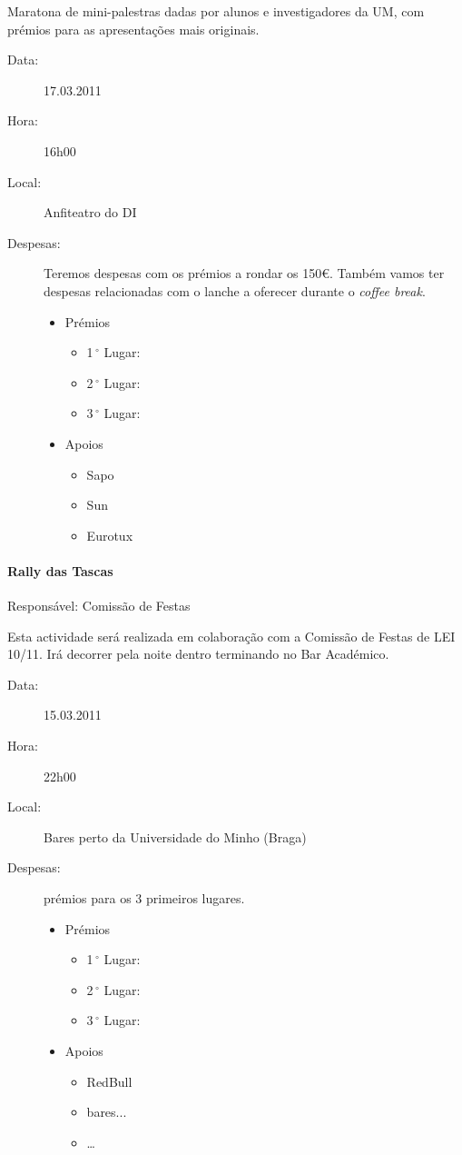 Maratona de mini-palestras dadas por alunos e investigadores da UM, com prémios para as apresentações mais originais.

\begin{description}
	\item[Data:] 17.03.2011
	\item[Hora:] 16h00
	\item[Local:] Anfiteatro do DI
	\item[Despesas:] Teremos despesas com os prémios a rondar os 150\euro. Também vamos ter despesas relacionadas com o lanche a oferecer durante o \emph{coffee break}.
		\begin{itemize}
		\item Prémios
		\begin{itemize}
			\item 1$\,^{\circ}$ Lugar:
			\item 2$\,^{\circ}$ Lugar:
			\item 3$\,^{\circ}$ Lugar:
		\end{itemize}
		\item Apoios
		\begin{itemize}
			\item Sapo
			\item Sun
			\item Eurotux
		\end{itemize}
	\end{itemize}
\end{description}

\paragraph{Rally das Tascas}
Responsável: Comissão de Festas

Esta actividade será realizada em colaboração com a Comissão de Festas de LEI 10/11. Irá decorrer pela noite dentro terminando no Bar Académico.

\begin{description}
	\item[Data:] 15.03.2011
	\item[Hora:] 22h00
	\item[Local:] Bares perto da Universidade do Minho (Braga)
	\item[Despesas:] prémios para os 3 primeiros lugares.
	\begin{itemize}
		\item Prémios
		\begin{itemize}
			\item 1$\,^{\circ}$ Lugar:
			\item 2$\,^{\circ}$ Lugar:
			\item 3$\,^{\circ}$ Lugar:
		\end{itemize}
		\item Apoios
		\begin{itemize}
			\item RedBull
			\item bares...
			\item \dots  
		\end{itemize}
	\end{itemize}
\end{description}



